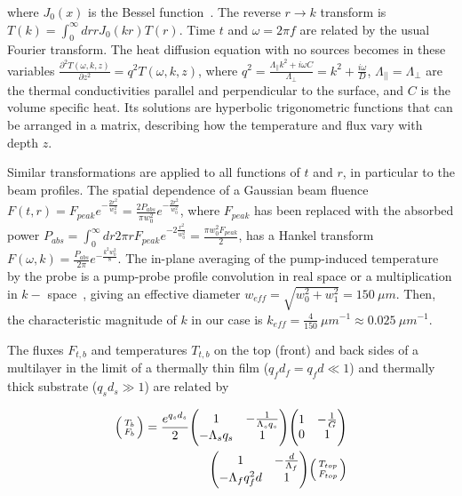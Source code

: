 \documentclass[5p]{elsarticle}
\begin{document}
\noindent where $J_{0}(x)$ is the Bessel function~\cite{2004Cahill}. The reverse $r \rightarrow k$ transform is $T(k)=\int_{0}^{\infty}dr r J_{0}(kr)T(r)$. Time $t$ and $\omega=2\pi f$ are related by the usual Fourier transform. The heat diffusion equation with no sources becomes in these variables $\frac{\partial ^{2}T(\omega,k,z)}{\partial z^{2}}=q^{2}T(\omega,k,z)$, where $q^{2}=\frac{\Lambda_{\parallel}k^{2}+i\omega C}{\Lambda_{\perp}}=k^{2}+\frac{i\omega}{D}$, $\Lambda_{||}=\Lambda_{\perp}$ are the thermal conductivities parallel and perpendicular to the surface, and $C$ is the volume specific heat. Its solutions are hyperbolic trigonometric functions that can be arranged in a matrix, describing how the temperature and flux vary with depth $z$.

Similar transformations are applied to all functions of $t$ and $r$, in particular to the beam profiles. The spatial dependence of a Gaussian beam fluence $F(t,r)=F_{peak}e^{-\frac{2r^{2}}{w_{0}^{2}}}=\frac{2P_{abs}}{\pi w_{0}^{2}}e^{-\frac{2r^{2}}{w_{0}^{2}}}$, where $F_{peak}$ has been replaced with the absorbed power $P_{abs}=\int_{0}^{\infty}dr 2\pi r F_{peak} e^{-2\frac{r^{2}}{w_{0}^{2}}}=\frac{\pi w_{0}^{2}F_{peak}}{2}$, has a Hankel transform $F(\omega,k)=\frac{P_{abs}}{2\pi}e^{-\frac{k^{2}w_{0}^{2}}{8}} $. The in-plane averaging of the pump-induced temperature by the probe is a pump-probe profile convolution in real space or a multiplication in $k-$ space~\cite{2004Cahill}, giving an effective diameter $w_{eff}=\sqrt{w_{0}^{2}+w_{1}^{2}}=150~\mu m$. Then, the characteristic magnitude of $k$ in our case is $k_{eff}=\frac{4}{150}~\mu m^{-1}\approx 0.025~\mu m^{-1}$.

The fluxes $F_{t,b}$ and temperatures $T_{t,b}$ on the top (front) and back sides of a multilayer in the limit of a thermally thin film ($q_{f}d_{f}=q_{f}d \ll 1$) and thermally thick substrate ($q_{s}d_{s} \gg 1$) are related by

\begin{eqnarray}
\Bigl(\begin{smallmatrix} T_{b}\\ F_{b} \end{smallmatrix} \Bigr)= \frac{e^{q_{s}d_{s}}}{2} \Biggl(\begin{matrix} 1 & -\frac{1}{\Lambda_{s} q_{s}} \\ -\Lambda_{s} q_{s}  & 1 \end{matrix} \Biggr) \Biggl(\begin{matrix} 1 & -\frac{1}{G} \\ 0 & 1 \end{matrix} \Biggr) \\ \nonumber
\Biggl(\begin{matrix} 1 & -\frac{d}{\Lambda_{f}} \\ -\Lambda_{f} q_{f}^{2} d & 1 \end{matrix} \Biggr) \Bigl(\begin{smallmatrix} T_{top}\\ F_{top} \end{smallmatrix} \Bigr)
\end{eqnarray}
\end{document}
